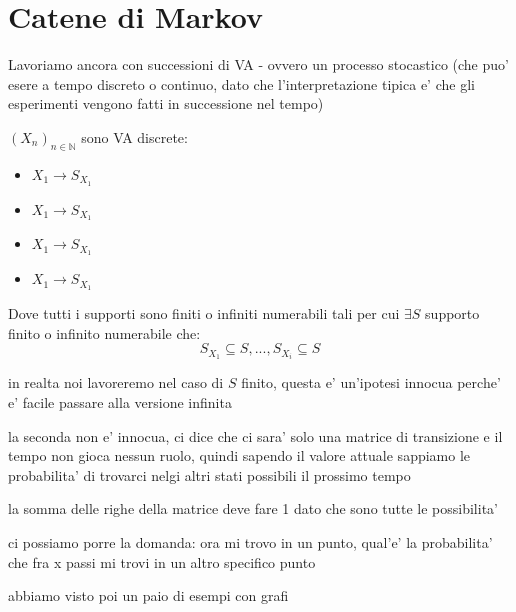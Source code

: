 % 
\chapter{Catene di Markov}
Lavoriamo ancora con successioni di VA - ovvero un processo stocastico (che puo' esere a tempo discreto o continuo, dato che l'interpretazione tipica e' che gli esperimenti vengono fatti in successione nel tempo) 

$ (X_n)_{n \in \mathbb{N}} $ sono VA discrete:
\begin{itemize}
\item $ X_1 \to S_{X_1} $
\item $ X_1 \to S_{X_1} $
\item $ X_1 \to S_{X_1} $
\item $ X_1 \to S_{X_1} $
\end{itemize}

Dove tutti i supporti sono finiti o infiniti numerabili tali per cui $ \exists S  $ supporto finito o infinito numerabile che:
\[
S_{X_1} \subseteq S, ..., S_{X_i} \subseteq S
\]

in realta noi lavoreremo nel caso di $ S  $ finito, questa e' un'ipotesi innocua perche' e' facile passare alla versione infinita

la seconda non e' innocua, ci dice che ci sara' solo una matrice di transizione e il tempo non gioca nessun ruolo, quindi sapendo il valore attuale sappiamo le probabilita' di trovarci nelgi altri stati possibili il prossimo tempo

la somma delle righe della matrice deve fare 1 dato che sono tutte le possibilita'

ci possiamo porre la domanda: ora mi trovo in un punto, qual'e' la probabilita' che fra x passi mi trovi in un altro specifico punto

abbiamo visto poi un paio di esempi con grafi

